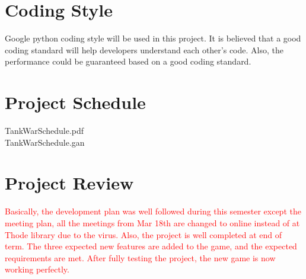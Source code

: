 \documentclass{article}
\begin{document}
\section{Coding Style}
Google python coding style will be used in this project. It is believed that a good coding standard will help developers understand each other's code. Also, the performance could be guaranteed based on a good coding standard. 

\section{Project Schedule}
TankWarSchedule.pdf
\\
TankWarSchedule.gan

\section{Project Review}
\textcolor{red}{Basically, the development plan was well followed during this semester except the meeting plan, all the meetings from Mar 18th are changed to online instead of at Thode library due to the virus. Also, the project is well completed at end of term. The three expected new features are added to the game, and the expected requirements are met. After fully testing the project, the new game is now working perfectly.}
\end{document}
